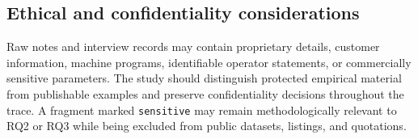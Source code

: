 \subsection{Ethical and confidentiality considerations}

Raw notes and interview records may contain proprietary details, customer information, machine programs, identifiable operator statements, or commercially sensitive parameters. The study should distinguish protected empirical material from publishable examples and preserve confidentiality decisions throughout the trace. A fragment marked \texttt{sensitive} may remain methodologically relevant to RQ2 or RQ3 while being excluded from public datasets, listings, and quotations.
